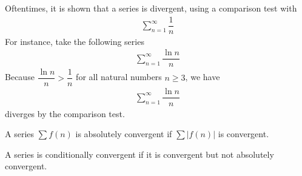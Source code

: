 \begin{example}
Oftentimes, it is shown that a series is divergent, using a comparison test with
\begin{align*}
    \sum_{n = 1}^{\infty} \dfrac{1}{n}
\end{align*}
For instance, take the following series
\begin{align*}
    \sum_{n = 1}^{\infty} \dfrac{\ln n}{n}
\end{align*}
Because $\dfrac{\ln n}{n} > \dfrac{1}{n}$ for all natural numbers $n \geq 3$, we have
\begin{align*}
    \sum_{n = 1}^{\infty} \dfrac{\ln n}{n} 
\end{align*}
diverges by the comparison test.
\end{example}

\begin{definition}
A series $\sum f(n)$ is absolutely convergent if $\sum \lvert f(n) \rvert$ is convergent. 
\end{definition}

\begin{definition}
A series is conditionally convergent if it is convergent but not absolutely convergent.
\end{definition}

